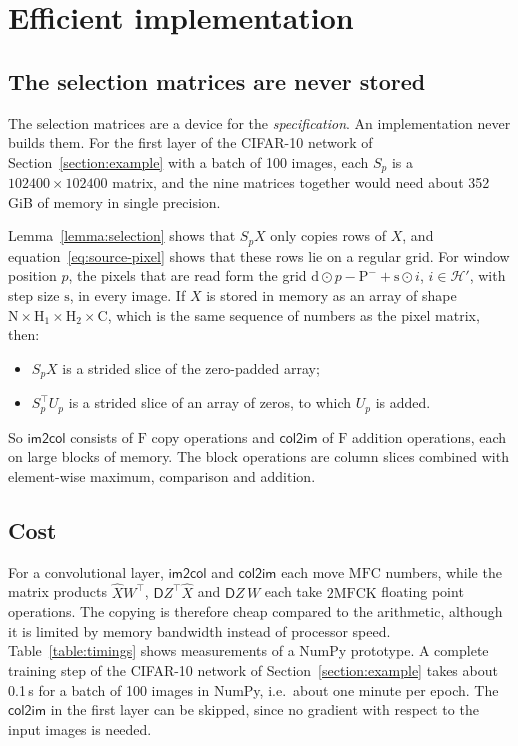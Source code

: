 \documentclass[twoside,11pt]{article}
\newcommand{\const}[1]{\ensuremath{\mathrm{#1}}} %
\newcommand{\func}[1]{\ensuremath{\textsf{#1}}}  %
\newcommand{\Gradient}{\textsf{D}}
\newcommand{\Hin}{\const{H}}         %
\newcommand{\Fs}{\const{F}}          %
\newcommand{\Pb}{\const{P}^{-}}      %
\newcommand{\cstr}{\const{s}}         %
\newcommand{\dil}{\const{d}}         %
\newcommand{\im}{\func{im2col}}
\newcommand{\ci}{\func{col2im}}
\newcommand{\outpix}{\mathcal{H}'}   %
\begin{document}
\section{Efficient implementation} \label{section:efficiency}

\subsection{The selection matrices are never stored}
The selection matrices are a device for the \emph{specification}. An implementation never builds them.
For the first layer of the CIFAR-10 network of Section~\ref{section:example} with a batch of 100 images, each $S_p$ is a $102400 \times 102400$ matrix, and the nine matrices together would need about 352\,GiB of memory in single precision.

Lemma~\ref{lemma:selection} shows that $S_p X$ only copies rows of $X$, and equation~\eqref{eq:source-pixel} shows that these rows lie on a regular grid.
For window position $p$, the pixels that are read form the grid $\dil \odot p - \Pb + \cstr \odot i$, $i \in \outpix$, with step size $\cstr$, in every image.
If $X$ is stored in memory as an array of shape $\const{N} \times \Hin_1 \times \Hin_2 \times \const{C}$, which is the same sequence of numbers as the pixel matrix, then:
\begin{itemize}
\item $S_p X$ is a strided slice of the zero-padded array;
\item $S_p^\top U_p$ is a strided slice of an array of zeros, to which $U_p$ is added.
\end{itemize}
So \im{} consists of $\Fs$ copy operations and \ci{} of $\Fs$ addition operations, each on large blocks of memory.
The block operations are column slices combined with element-wise maximum, comparison and addition.

\subsection{Cost}
For a convolutional layer, \im{} and \ci{} each move $\const{M}\Fs\const{C}$ numbers, while the matrix products $\hat X W^\top$, $\Gradient Z^\top \hat X$ and $\Gradient Z\, W$ each take $2\const{M}\Fs\const{C}\const{K}$ floating point operations.
The copying is therefore cheap compared to the arithmetic, although it is limited by memory bandwidth instead of processor speed.
Table~\ref{table:timings} shows measurements of a NumPy prototype.
A complete training step of the CIFAR-10 network of Section~\ref{section:example} takes about 0.1\,s for a batch of 100 images in NumPy, i.e.\ about one minute per epoch.
The \ci{} in the first layer can be skipped, since no gradient with respect to the input images is needed.
\end{document}
